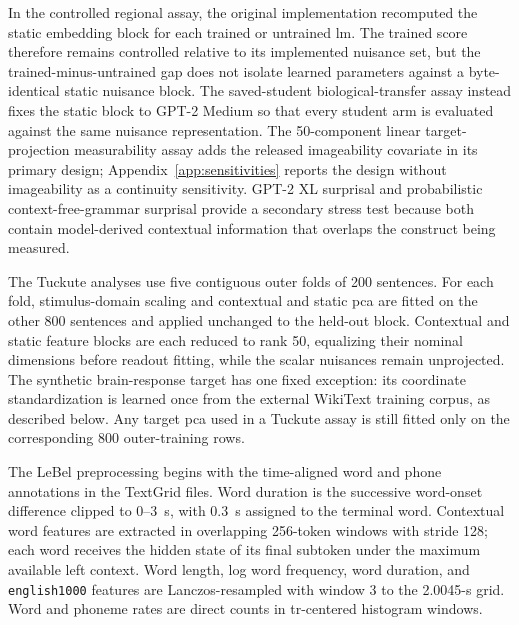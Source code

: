 In the controlled regional assay, the original implementation recomputed the static embedding block for each trained or untrained \ac{lm}.
The trained score therefore remains controlled relative to its implemented nuisance set, but the trained-minus-untrained gap does not isolate learned parameters against a byte-identical static nuisance block.
The saved-student biological-transfer assay instead fixes the static block to GPT-2 Medium so that every student arm is evaluated against the same nuisance representation.
The 50-component linear target-projection measurability assay adds the released imageability covariate in its primary design; Appendix~\ref{app:sensitivities} reports the design without imageability as a continuity sensitivity.
GPT-2 XL surprisal and probabilistic context-free-grammar surprisal provide a secondary stress test because both contain model-derived contextual information that overlaps the construct being measured. 

The Tuckute analyses use five contiguous outer folds of 200 sentences.
For each fold, stimulus-domain scaling and contextual and static \ac{pca} are fitted on the other 800 sentences and applied unchanged to the held-out block.
Contextual and static feature blocks are each reduced to rank 50, equalizing their nominal dimensions before readout fitting, while the scalar nuisances remain unprojected.
The synthetic brain-response target has one fixed exception: its coordinate standardization is learned once from the external WikiText training corpus, as described below.
Any target \ac{pca} used in a Tuckute assay is still fitted only on the corresponding 800 outer-training rows. 

The LeBel preprocessing begins with the time-aligned word and phone annotations in the TextGrid files.
Word duration is the successive word-onset difference clipped to 0--3~s, with 0.3~s assigned to the terminal word. 
Contextual word features are extracted in overlapping 256-token windows with stride 128; each word receives the hidden state of its final subtoken under the maximum available left context.
Word length, log word frequency, word duration, and \texttt{english1000} features are Lanczos-resampled with window 3 to the 2.0045-s grid. 
Word and phoneme rates are direct counts in \ac{tr}-centered histogram windows. 

